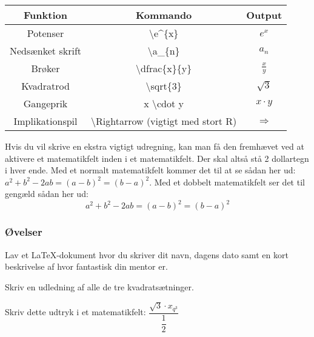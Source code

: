 \begin{center}
\begin{tabular}{|c|c|c|}
	 \hline
	 \textbf{Funktion} & \textbf{Kommando} & \textbf{Output} \\ \hline
	 Potenser & \textbackslash e\^{}\{x\} & $e^x$ \\ \hline
	 Nedsænket skrift & \textbackslash a\_\{n\} & $a_{n}$ \\ \hline
	 Brøker & \textbackslash dfrac\{x\}\{y\} & $\frac{x}{y}$ \\ \hline
	 Kvadratrod & \textbackslash sqrt\{3\} & $\sqrt{3}$\\ \hline
	 Gangeprik & x \textbackslash cdot y & $x \cdot y$\\ \hline
	 Implikationspil & \textbackslash Rightarrow (vigtigt med stort R) & $\Rightarrow$\\ \hline
\end{tabular}
\end{center}

Hvis du vil skrive en ekstra vigtigt udregning, kan man få den fremhævet ved at aktivere et matematikfelt inden i et matematikfelt.
Der skal altså stå 2 dollartegn i hver ende.
Med et normalt matematikfelt kommer det til at se sådan her ud: $a^2+b^2-2ab=(a-b)^2=(b-a)^2$. Med et dobbelt matematikfelt ser det til gengæld sådan her ud: $$a^2+b^2-2ab=(a-b)^2=(b-a)^2$$

\subsubsection{Øvelser}
\begin{opg}
Lav et \LaTeX{-dokument} hvor du skriver dit navn, dagens dato samt en kort beskrivelse af hvor fantastisk din mentor er.
\end{opg}

\begin{opg}
Skriv en udledning af alle de tre kvadratsætninger.
\end{opg}

\begin{opg}
Skriv dette udtryk i et matematikfelt: $\dfrac{\sqrt{3} \cdot  x_{q^3}}{\dfrac{1}{2}}$
\end{opg}

